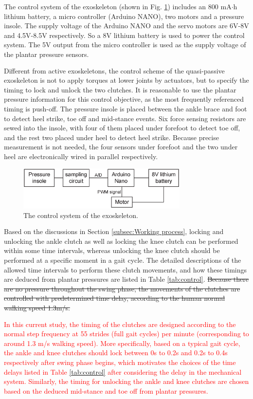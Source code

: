 \documentclass[twocolumn,cleanfoot,10pt]{asme2ej}
\begin{document}
The control system of the exoskeleton (shown in Fig. \ref{fig:control}) includes an 800 mA$\cdot$h lithium battery, a micro controller (Arduino NANO), two motors and a pressure insole.
The supply voltage of the Arduino NANO and the servo motors are 6V-8V and 4.5V-8.5V respectively.
So a 8V lithium battery is used to power the control system.
The 5V output from the micro controller is used as the supply voltage of the plantar pressure sensors. 

Different from active exoskeletons, the control scheme of the quasi-passive exoskeleton is not to apply torques at lower joints by actuators, but to specify the timing to lock and unlock the two clutches.
It is reasonable to use the plantar pressure information for this control objective, as the most frequently referenced timing is push-off.
The pressure insole is placed between the ankle brace and foot to detect heel strike, toe off and mid-stance events.
Six force sensing resistors are sewed into the insole, with four of them placed under forefoot to detect toe off, and the rest two placed under heel to detect heel strike.
Because precise measurement is not needed, the four sensors under forefoot and the two under heel are electronically wired in parallel respectively. 

\begin{figure}[t]
	\centering
	\includegraphics[width=8.5cm]{control.eps}
	\caption{The control system of the exoskeleton.}
	\label{fig:control}   
\end{figure}

Based on the discussions in Section \ref{subsec:Working process}, locking and unlocking the ankle clutch as well as locking the knee clutch can be performed within some time intervals, whereas unlocking the knee clutch should be performed at a specific moment in a gait cycle.
The detailed descriptions of the allowed time intervals to perform these clutch movements, and how these timings are deduced from plantar pressures are listed in Table \ref{tab:control}.
\sout{Because there are no pressure throughout the swing phase, the movements of the clutches are controlled with predetermined time delay, according to the human normal walking speed 1.3m/s.}

\textcolor{red}{In this current study, the timing of the clutches are designed according to the normal step frequency at 55 strides (full gait cycles) per minute (corresponding to around 1.3 m/s walking speed).
More specifically, based on a typical gait cycle, the ankle and knee clutches should lock between 0s to 0.2s and 0.2s to 0.4s respectively after swing phase begins, which motivates the choices of the time delays listed in Table \ref{tab:control} after considering the delay in the mechanical system.
Similarly, the timing for unlocking the ankle and knee clutches are chosen based on the deduced mid-stance and toe off from plantar pressures.}
\end{document}
